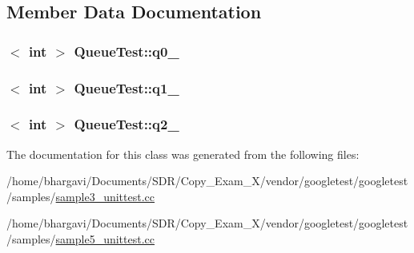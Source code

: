 \subsection{Member Data Documentation}
\subsubsection[{\texorpdfstring{q0\+\_\+}{q0_}}]{$<$ int $>$ Queue\+Test\+::q0\+\_\+\hspace{0.3cm}{\ttfamily [protected]}}\hypertarget{class_queue_test_a0eba1fe2b31d75abd2df688ca5245e22}{}\label{class_queue_test_a0eba1fe2b31d75abd2df688ca5245e22}
\subsubsection[{\texorpdfstring{q1\+\_\+}{q1_}}]{$<$ int $>$ Queue\+Test\+::q1\+\_\+\hspace{0.3cm}{\ttfamily [protected]}}\hypertarget{class_queue_test_a1e55594e71820ba0f1b09591fb328c30}{}\label{class_queue_test_a1e55594e71820ba0f1b09591fb328c30}
\subsubsection[{\texorpdfstring{q2\+\_\+}{q2_}}]{$<$ int $>$ Queue\+Test\+::q2\+\_\+\hspace{0.3cm}{\ttfamily [protected]}}\hypertarget{class_queue_test_aeb7a2e3f6ce2d97d84eb1e01468adc2f}{}\label{class_queue_test_aeb7a2e3f6ce2d97d84eb1e01468adc2f}


The documentation for this class was generated from the following files\+:\begin{DoxyCompactItemize}
\item 
/home/bhargavi/\+Documents/\+S\+D\+R/\+Copy\+\_\+\+Exam\+\_\+X/vendor/googletest/googletest/samples/\hyperlink{sample3__unittest_8cc}{sample3\+\_\+unittest.\+cc}\item 
/home/bhargavi/\+Documents/\+S\+D\+R/\+Copy\+\_\+\+Exam\+\_\+X/vendor/googletest/googletest/samples/\hyperlink{sample5__unittest_8cc}{sample5\+\_\+unittest.\+cc}\end{DoxyCompactItemize}
